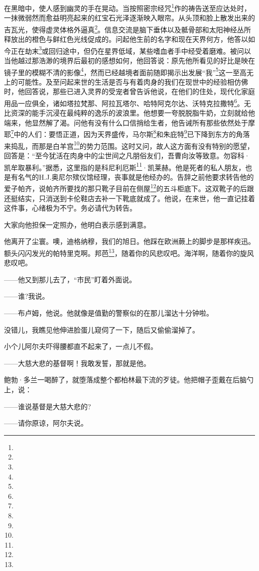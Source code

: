 \par 在黑暗中，使人感到幽灵的手在晃动。当按照密宗经咒\footnote{}作的祷告送至应达处时，一抹微弱然而愈益明亮起来的红宝石光泽逐渐映入眼帘。从头顶和脸上散发出来的吉瓦光，使得虚灵体格外逼真\footnote{}。信息交流是脑下垂体以及骶骨部和太阳神经丛所释放出的橙色与鲜红色光线促成的。问起他生前的名字和现在天界何方，他答以如今正在劫末\footnote{}或回归途中，但仍在星界低域，某些嗜血者手中经受着磨难。被问以当他越过那浩渺的境界后最初的感想如何，他回答说：原先他所看见的好比是映在镜子里的模糊不清的影像\footnote{}，然而已经越境者面前随即揭示出发展“我”\footnote{}这一至高无上的可能性。及至问起来世的生活是否与有着肉身的我们在现世中的经验相仿佛时，他回答说，那些已进入灵界的受宠者曾告诉他说，在他们的住处，现代化家庭用品一应俱全，诸如塔拉梵那、阿拉瓦塔尔、哈特阿克尔达、沃特克拉撒特\footnote{}。无比资深的能手沉浸在最纯粹的逸乐的波浪里。他想要一夸脱脱脂牛奶，立刻就给他端来，他显然解了渴。问他有没有什么口信捎给生者，他告诫所有那些依然处于摩耶\footnote{}中的人们：要悟正道，因为天界盛传，马尔斯\footnote{}和朱庇特\footnote{}已下降到东方的角落来捣乱，而那是白羊宫\footnote{}的势力范围。这时又问，故人这方面有没有特别的愿望，回答是：“至今犹活在肉身中的尘世间之凡朋俗友们，吾曹向汝等致意。勿容科·凯牟取暴利。”据悉，这里指的是科尼利厄斯\footnote{}·凯莱赫。他是死者的私人朋友，也是有名气的H.J.奥尼尔殡仪馆经理，丧事就是他经办的。告辞之前他要求转告他的爱子帕齐，说帕齐所要找的那只靴子目前在侧屋\footnote{}的五斗柜底下。这双靴子的后跟还挺结实，只消送到卡伦鞋店去补一下靴底就成了。他说，在来世，他一直记挂着这件事，心绪极为不宁。务必请代为转告。
\par 大家向他担保一定照办，他明白表示感到满意。
\par 他离开了尘寰。噢，迪格纳穆，我们的旭日。他踩在欧洲蕨上的脚步是那样疾迅。额头闪闪发光的帕特里克啊。邦芭\footnote{}，随着你的风悲叹吧。海洋啊，随着你的旋风悲叹吧。
\par ——他又到那儿去了，“市民”盯着外面说。
\par ——谁?我说。
\par ——布卢姆，他说。他就像是值勤的警察似的在那儿溜达十分钟啦。
\par 没错儿，我瞧见他伸进脸蛋儿窥伺了一下，随后又偷偷溜掉了。
\par 小个儿阿尔夫吓得腰都直不起来了，一点儿不假。
\par ——大慈大悲的基督啊！我敢发誓，那就是他。
\par 鲍勃·多兰一喝醉了，就堕落成整个都柏林最下流的歹徒。他把帽子歪戴在后脑勺上，说：
\par ——谁说基督是大慈大悲的?
\par ——请你原谅，阿尔夫说。

